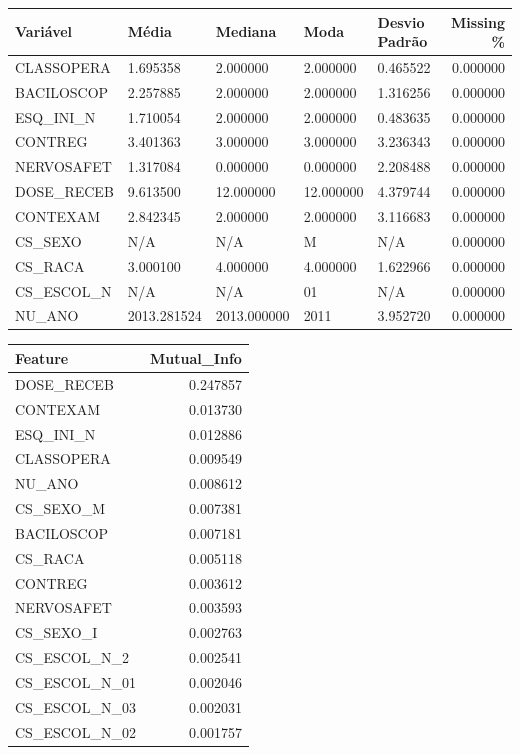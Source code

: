 \begin{tabular}{lllllr}
\toprule
Variável & Média & Mediana & Moda & Desvio Padrão & Missing \% \\
\midrule
CLASSOPERA & 1.695358 & 2.000000 & 2.000000 & 0.465522 & 0.000000 \\
BACILOSCOP & 2.257885 & 2.000000 & 2.000000 & 1.316256 & 0.000000 \\
ESQ\_INI\_N & 1.710054 & 2.000000 & 2.000000 & 0.483635 & 0.000000 \\
CONTREG & 3.401363 & 3.000000 & 3.000000 & 3.236343 & 0.000000 \\
NERVOSAFET & 1.317084 & 0.000000 & 0.000000 & 2.208488 & 0.000000 \\
DOSE\_RECEB & 9.613500 & 12.000000 & 12.000000 & 4.379744 & 0.000000 \\
CONTEXAM & 2.842345 & 2.000000 & 2.000000 & 3.116683 & 0.000000 \\
CS\_SEXO & N/A & N/A & M & N/A & 0.000000 \\
CS\_RACA & 3.000100 & 4.000000 & 4.000000 & 1.622966 & 0.000000 \\
CS\_ESCOL\_N & N/A & N/A & 01 & N/A & 0.000000 \\
NU\_ANO & 2013.281524 & 2013.000000 & 2011 & 3.952720 & 0.000000 \\
\bottomrule
\end{tabular}


\begin{tabular}{lr}
\toprule
Feature & Mutual\_Info \\
\midrule
DOSE\_RECEB & 0.247857 \\
CONTEXAM & 0.013730 \\
ESQ\_INI\_N & 0.012886 \\
CLASSOPERA & 0.009549 \\
NU\_ANO & 0.008612 \\
CS\_SEXO\_M & 0.007381 \\
BACILOSCOP & 0.007181 \\
CS\_RACA & 0.005118 \\
CONTREG & 0.003612 \\
NERVOSAFET & 0.003593 \\
CS\_SEXO\_I & 0.002763 \\
CS\_ESCOL\_N\_2 & 0.002541 \\
CS\_ESCOL\_N\_01 & 0.002046 \\
CS\_ESCOL\_N\_03 & 0.002031 \\
CS\_ESCOL\_N\_02 & 0.001757 \\
\bottomrule
\end{tabular}
